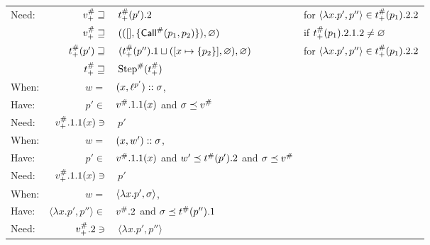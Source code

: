 \begin{center}
\begin{tabular}{|l@{\hskip2pt}r@{\hskip2pt}l@{\hskip2pt}l|}
    Need: & ${v}^{\#}_+\sqsupseteq$              & $\:{t}^{\#}_+(p').2$                                                             & for $\langle\lambda x.p',p''\rangle\in{t}^{\#}_+(p_1).2.2$ \\
          & ${v}^{\#}_+\sqsupseteq$              & $\:(([],\{{\textsf{Call}}^{\#}(p_1,p_2)\}),\varnothing)$                                     & if ${t}^{\#}_+(p_1).2.1.2\neq\varnothing$                  \\
          & ${t}^{\#}_+(p')\sqsupseteq$       & $\:({t}^{\#}_+(p'').1\sqcup([x\mapsto\{p_2\}],\varnothing),\varnothing)$         & for $\langle\lambda x.p',p''\rangle\in{t}^{\#}_+(p_1).2.2$ \\
          & ${t}^{\#}_+\sqsupseteq$           & $\:{\text{Step}}^{\#}({t}^{\#}_+)$                                                        &                                                              \\
    \hline
    When: & $w=$                                & $(x,{\ell}^{p'})::\sigma$,                                                  &                                                              \\
    Have: & $p'\in$                             & ${v}^{\#}.1.1(x)$ and $\sigma\preceq{v}^{\#}$                                          &                                                              \\
    Need: & ${v}^{\#}_+.1.1(x)\ni$               & $\:p'$                                                                             &                                                              \\
    \hline
    When: & $w=$                                & $(x,w')::\sigma$,                                                                 &                                                              \\
    Have: & $p'\in$                             & ${v}^{\#}.1.1(x)$ and $w'\preceq{t}^{\#}(p').2$ and $\sigma\preceq{v}^{\#}$          &                                                              \\
    Need: & ${v}^{\#}_+.1.1(x)\ni$               & $\:p'$                                                                             &                                                              \\
    \hline
    When: & $w=$                                & $\langle\lambda x.p',\sigma\rangle$,                                                 &                                                              \\
    Have: & $\langle\lambda x.p',p''\rangle\in$ & ${v}^{\#}.2$ and $\sigma\preceq{t}^{\#}(p'').1$                                     &                                                              \\
    Need: & ${v}^{\#}_+.2\ni$                    & $\:\langle\lambda x.p',p''\rangle$                                                 &                                                              \\
    \hline
  \end{tabular}
\end{center}
